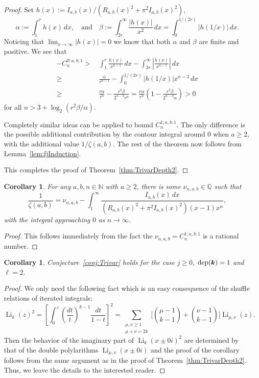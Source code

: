 \documentclass[11pt]{article}
\newcommand\ga{{\alpha}}
\newcommand{\bfk}{{\boldsymbol{\sl{k}}}}
\DeclareMathOperator*{\dep}{dep}
\DeclareMathOperator{\Li}{Li}
\def\N{\mathbb{N}}
\def\Q{\mathbb{Q}}
\theoremstyle{plain}
\newtheorem{cor}[thm]{Corollary}
\theoremstyle{definition}
\begin{document}
\begin{proof}
Set $h(x):=I_{a,b}(x)/(R_{a,b}(x)^2+\pi^2 I_{a,b}(x)^2)$,
\begin{equation*}
\ga:=\int_1^r h(x)\, dx, \quad\text{and}\quad \beta:=\int_{2r}^\infty \frac{|h(x)|}{x^{2}}\, dx=\int_0^{1/(2r)} |h(1/x)|\, dx.
\end{equation*}
Noticing that $\lim_{x\to \infty} |h(x)|=0$ we know that both $\ga$ and $\beta$ are finite and positive.
We see that
\begin{align*}
-C_{n}^{0;a,b;1}> &\, \int_1^r \frac{h(x)}{x^{n-1}} \, dx-\int_{2r}^\infty \left|\frac{h(x)}{x^{n-1}}\right| \, dx\\
\ge &\, \frac{\ga}{r^{n-1}}-\int_0^{1/(2r)} |h(1/x)| x^{n-3}  \, dx\\
\ge &\, \frac{r\ga}{r^n} -  \frac{r^3\beta}{2^{n-3} r^n}=\frac{r\ga}{r^n} \left( 1-\frac{r^2\beta}{2^{n-3}\ga}\right)>0
\end{align*}
for all $n>3+\log_2(r^2\beta/\ga)$.

Completely similar ideas can be applied to bound $C_{n}^{1;a,b;1}$. The only difference is the possible additional contribution
by the contour integral around $0$ when $a\ge 2$, with the additional value $1/\zeta(a,b)$. The rest of the theorem now follows
from Lemma~\ref{lem:fjInduction}.

This completes the proof of Theorem~\ref{thm:TrivarDepth2}.
\end{proof}


\begin{cor}\label{cor:ratZeta(a,b)}
For any $a,b,n\in\N$ with $a\ge 2$, there is some $\nu_{n,a,b}\in\Q$ such that
\begin{equation*}
    \frac{1}{\zeta(a,b)}=\nu_{n,a,b}-\int_1^\infty\frac{I_{a,b}(x)\, dx}{(R_{a,b}(x)^2+\pi^2 I_{a,b}(x)^2)(x-1) x^n},
\end{equation*}
with the integral approaching $0$ as $n\to\infty$.
\end{cor}
\begin{proof}
This follows immediately from the fact the $\nu_{n,a,b}=C_{n}^{1;a,b;1}$ is a rational number.
\end{proof}

\begin{cor}\label{cor:iteratedInt}
Conjecture~\ref{conj:Trivar} holds for the case $j\ge 0$, $\dep(\bfk)=1$ and $\ell=2$.
\end{cor}
\begin{proof}
We only need the following fact which is an easy consequence of the shuffle relations of iterated integrals:
\begin{equation*}
 \Li_k(z)^2=\left[\int_0^z \left(\frac{dt}{t}\right)^{k-1} \frac{dt}{1-t}\right]^2
= \sum_{\substack{\mu,\nu\ge 1\\ \mu+\nu=2k}}
\bigg[\binom{\mu-1}{k-1}+\binom{\nu-1}{k-1}\bigg] \Li_{\mu,\nu}(z).
\end{equation*}
Then the behavior of the imaginary part of $\Li_k(x\pm 0i)^2$ are determined by that of the double polylarithms $\Li_{\mu,\nu}(x\pm 0i)$
and the proof of the corollary follows from the same argument as in the proof of Theorem~\ref{thm:TrivarDepth2}. Thus, we leave the details to the interested reader.
\end{proof}
\end{document}
